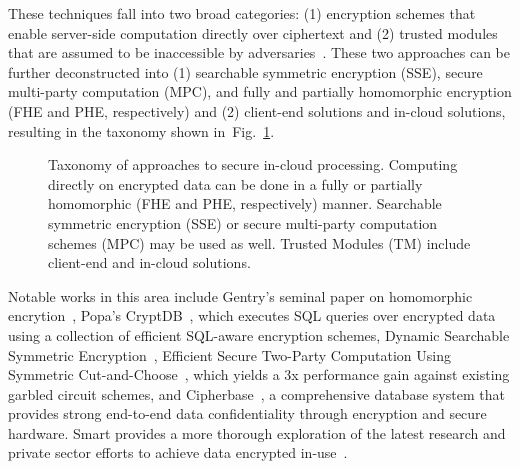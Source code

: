 \documentclass[notitlepage,longbibliography]{revtex4-1}
\newcommand{\figref}[1]{Fig.~\ref{#1}}
\begin{document}
These techniques fall into two broad categories: (1) encryption schemes that enable server-side computation directly over ciphertext and (2) trusted modules that are assumed to be inaccessible by adversaries~\cite{tutorial}. These two approaches can be further deconstructed into (1) searchable symmetric encryption (SSE), secure multi-party computation (MPC), and fully and partially homomorphic encryption (FHE and PHE, respectively) and (2) client-end solutions and in-cloud solutions, resulting in the taxonomy shown in~\figref{fig:taxonomy}.

\begin{figure}
	\begin{center}
	\end{center}
  \caption{Taxonomy of approaches to secure in-cloud processing.
    Computing directly on encrypted data can be done in a fully or partially homomorphic (FHE and PHE, respectively) manner.
    Searchable symmetric encryption (SSE) or secure multi-party computation schemes (MPC) may be used as well.
    Trusted Modules (TM) include client-end and in-cloud solutions.}
	\label{fig:taxonomy}
\end{figure}

Notable works in this area include Gentry's seminal paper on homomorphic encrytion~\cite{gentry}, Popa's CryptDB~\cite{cryptdb}, which executes SQL queries
over encrypted data using a collection of efficient SQL-aware encryption schemes, Dynamic Searchable Symmetric Encryption~\cite{dynamicsse}, Efficient Secure Two-Party Computation Using Symmetric Cut-and-Choose~\cite{mpc}, which yields a 3x performance gain against existing garbled circuit schemes, and Cipherbase~\cite{cipherbase}, a comprehensive database system that provides strong end-to-end data confidentiality through encryption and secure hardware.
Smart provides a more thorough exploration of the latest research and private sector efforts to achieve data encrypted in-use~\cite{smart}.
\end{document}
